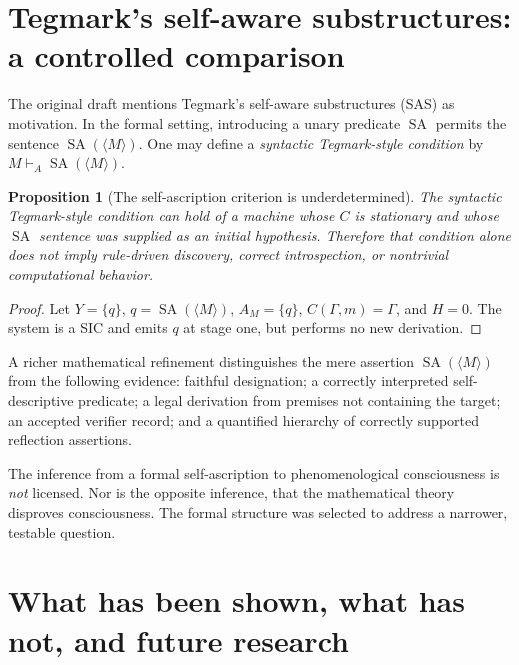 \documentclass[11pt,letterpaper]{article}
\newtheorem{proposition}[theorem]{Proposition}
\theoremstyle{definition}\newtheorem{definition}[theorem]{Definition}\newtheorem{example}[theorem]{Example}\newtheorem{protocol}[theorem]{Protocol}\newtheorem{question}[theorem]{Open Problem}
\theoremstyle{remark}\newtheorem{remark}[theorem]{Remark}
\newcommand{\Mtag}{\langle M\rangle}
\begin{document}
\section{Tegmark's self-aware substructures: a controlled comparison}
The original draft mentions Tegmark's self-aware substructures (SAS) as motivation. In the formal setting, introducing a unary predicate $\operatorname{SA}$ permits the sentence $\operatorname{SA}(\Mtag)$. One may define a \emph{syntactic Tegmark-style condition} by $M\vdash_A\operatorname{SA}(\Mtag)$.

\begin{proposition}[The self-ascription criterion is underdetermined]
The syntactic Tegmark-style condition can hold of a machine whose $C$ is stationary and whose $\operatorname{SA}$ sentence was supplied as an initial hypothesis. Therefore that condition alone does not imply rule-driven discovery, correct introspection, or nontrivial computational behavior.
\end{proposition}
\begin{proof}
Let $Y=\{q\}$, $q=\operatorname{SA}(\Mtag)$, $A_M=\{q\}$, $C(\Gamma,m)=\Gamma$, and $H=0$. The system is a SIC and emits $q$ at stage one, but performs no new derivation.
\end{proof}
A richer mathematical refinement distinguishes the mere assertion $\operatorname{SA}(\Mtag)$ from the following evidence: faithful designation; a correctly interpreted self-descriptive predicate; a legal derivation from premises not containing the target; an accepted verifier record; and a quantified hierarchy of correctly supported reflection assertions.

The inference from a formal self-ascription to phenomenological consciousness is \emph{not} licensed. Nor is the opposite inference, that the mathematical theory disproves consciousness. The formal structure was selected to address a narrower, testable question.

\section{What has been shown, what has not, and future research}
\end{document}
